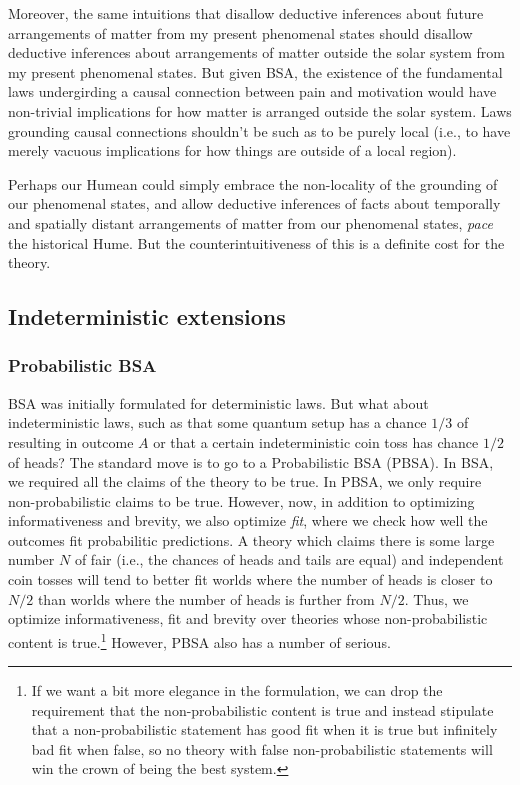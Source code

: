 Moreover, the same intuitions that disallow deductive inferences about future arrangements of matter from my present
phenomenal states should disallow deductive inferences about arrangements of matter outside the solar system from my present
phenomenal states. But given BSA, the existence of the fundamental laws undergirding a causal connection between 
pain and motivation would have non-trivial implications for how matter is arranged outside the solar system. Laws grounding 
causal connections shouldn't be such as to be purely local (i.e., to have merely vacuous implications for how things are outside
of a local region). 

Perhaps our Humean could simply embrace the non-locality of the grounding of our phenomenal states, and allow deductive inferences
of facts about temporally and spatially distant arrangements of matter from our phenomenal states, \textit{pace} the historical Hume.
But the counterintuitiveness of this is a definite cost for the theory.

\subsection{Indeterministic extensions}
\subsubsection{Probabilistic BSA}
BSA was initially formulated for deterministic laws. But what about indeterministic laws, such as that some quantum setup has a
chance $1/3$ of resulting in outcome $A$ or that a certain indeterministic coin toss has chance $1/2$
of heads? The standard move is to go to a Probabilistic BSA (PBSA). In BSA, we required all the claims of the theory to be true.
In PBSA, we only require non-probabilistic claims to be true. However, now, in addition to optimizing informativeness and 
brevity, we also optimize \textit{fit}, where we check how well the outcomes fit probabilitic predictions. A theory which claims 
there is some large number $N$ of fair (i.e., the chances of heads and tails are equal) and independent  
coin tosses will tend to better fit worlds where the number of heads is closer to $N/2$ than worlds where the number of heads is 
further from $N/2$. Thus, we optimize informativeness, fit and brevity over theories whose non-probabilistic content is true.\footnote{If we 
want a bit more elegance in the formulation, we can drop the requirement that the non-probabilistic content is true and instead
stipulate that a non-probabilistic statement has good fit when it is true but infinitely bad fit when false, so no theory with false
non-probabilistic statements will win the crown of being the best system.} However, PBSA also has a number of serious.

